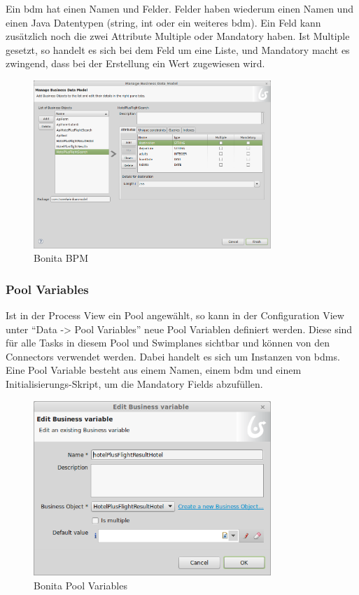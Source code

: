 Ein \gls{bdm} hat einen Namen und Felder. Felder haben wiederum einen Namen und einen Java Datentypen (string, int oder ein weiteres \gls{bdm}). Ein Feld kann zusätzlich noch die zwei Attribute Multiple oder Mandatory haben. Ist Multiple gesetzt, so handelt es sich bei dem Feld um eine Liste, und Mandatory macht es zwingend, dass bei der Erstellung ein Wert zugewiesen wird.

\begin{figure}[H]
	\centering
	\includegraphics[width=0.8\textwidth]{images/bonita-bpm.png}
	\caption{Bonita BPM}
	\label{fig:analyse:bonita:bpm}
\end{figure}

\subsubsection{Pool Variables}
Ist in der Process View ein Pool angewählt, so kann in der Configuration View unter "`Data -> Pool Variables"' neue Pool Variablen definiert werden. Diese sind für alle Tasks in diesem Pool und Swimplanes sichtbar und können von den Connectors verwendet werden. Dabei handelt es sich um Instanzen von \glspl{bdm}. Eine Pool Variable besteht aus einem Namen, einem \gls{bdm} und einem Initialisierungs-Skript, um die Mandatory Fields abzufüllen.
\begin{figure}[H]
	\centering
	\includegraphics[width=0.8\textwidth]{images/bonita-poolvariables.png}
	\caption{Bonita Pool Variables}
	\label{fig:analyse:bonita:bpm:poolvariables}
\end{figure}

